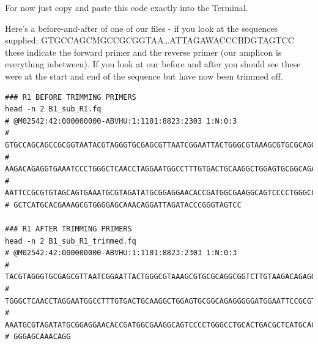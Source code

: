 \documentclass[
]{book}
\newenvironment{Shaded}{\begin{snugshade}}{\end{snugshade}}
\newcommand{\AttributeTok}[1]{\textcolor[rgb]{0.77,0.63,0.00}{#1}}
\newcommand{\BuiltInTok}[1]{#1}
\newcommand{\ControlFlowTok}[1]{\textcolor[rgb]{0.13,0.29,0.53}{\textbf{#1}}}
\newcommand{\DataTypeTok}[1]{\textcolor[rgb]{0.13,0.29,0.53}{#1}}
\newcommand{\DecValTok}[1]{\textcolor[rgb]{0.00,0.00,0.81}{#1}}
\newcommand{\ExtensionTok}[1]{#1}
\newcommand{\FunctionTok}[1]{\textcolor[rgb]{0.00,0.00,0.00}{#1}}
\newcommand{\KeywordTok}[1]{\textcolor[rgb]{0.13,0.29,0.53}{\textbf{#1}}}
\newcommand{\NormalTok}[1]{#1}
\newcommand{\OperatorTok}[1]{\textcolor[rgb]{0.81,0.36,0.00}{\textbf{#1}}}
\newcommand{\StringTok}[1]{\textcolor[rgb]{0.31,0.60,0.02}{#1}}
\newcommand{\VariableTok}[1]{\textcolor[rgb]{0.00,0.00,0.00}{#1}}
\begin{document}
For now just copy and paste this code exactly into the Terminal.

\begin{Shaded}
\end{Shaded}

Here's a before-and-after of one of our files - if you look at the sequences supplied: GTGCCAGCMGCCGCGGTAA\ldots ATTAGAWACCCBDGTAGTCC these indicate the forward primer and the reverse primer (our amplicon is everything inbetween). If you look at our before and after you should see these were at the start and end of the sequence but have now been trimmed off.

\begin{verbatim}
### R1 BEFORE TRIMMING PRIMERS
head -n 2 B1_sub_R1.fq
# @M02542:42:000000000-ABVHU:1:1101:8823:2303 1:N:0:3
# GTGCCAGCAGCCGCGGTAATACGTAGGGTGCGAGCGTTAATCGGAATTACTGGGCGTAAAGCGTGCGCAGGCGGTCTTGT
# AAGACAGAGGTGAAATCCCTGGGCTCAACCTAGGAATGGCCTTTGTGACTGCAAGGCTGGAGTGCGGCAGAGGGGGATGG
# AATTCCGCGTGTAGCAGTGAAATGCGTAGATATGCGGAGGAACACCGATGGCGAAGGCAGTCCCCTGGGCCTGCACTGAC
# GCTCATGCACGAAAGCGTGGGGAGCAAACAGGATTAGATACCCGGGTAGTCC

### R1 AFTER TRIMMING PRIMERS
head -n 2 B1_sub_R1_trimmed.fq
# @M02542:42:000000000-ABVHU:1:1101:8823:2303 1:N:0:3
# TACGTAGGGTGCGAGCGTTAATCGGAATTACTGGGCGTAAAGCGTGCGCAGGCGGTCTTGTAAGACAGAGGTGAAATCCC
# TGGGCTCAACCTAGGAATGGCCTTTGTGACTGCAAGGCTGGAGTGCGGCAGAGGGGGATGGAATTCCGCGTGTAGCAGTG
# AAATGCGTAGATATGCGGAGGAACACCGATGGCGAAGGCAGTCCCCTGGGCCTGCACTGACGCTCATGCACGAAAGCGTG
# GGGAGCAAACAGG
\end{verbatim}
\end{document}
